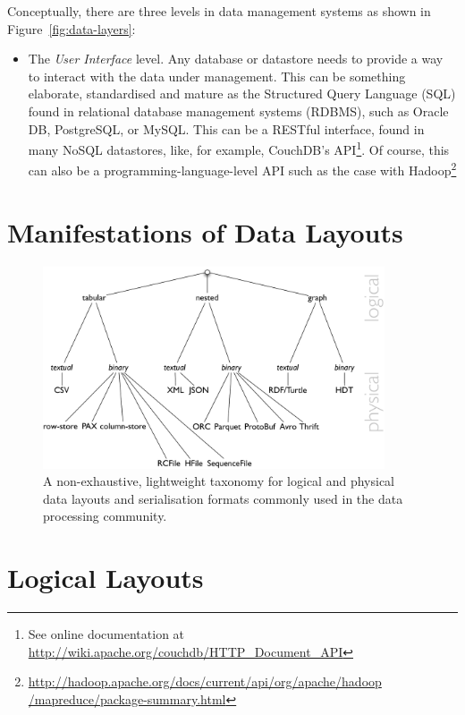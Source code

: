 \documentclass{llncs}
\begin{document}
Conceptually, there are three levels in data management systems as shown in
Figure~\ref{fig:data-layers}:
\begin{itemize}
	\item The \emph{User Interface} level. Any database or datastore needs 
to provide a way to interact with the data under management. This can be 
something elaborate, standardised and mature as the Structured Query Language 
(SQL) found in relational database management systems (RDBMS), such as 
Oracle DB, PostgreSQL, or MySQL. This can be a RESTful interface, found in many 
NoSQL datastores, like, for example, CouchDB's API\footnote{See online 
documentation at \url{http://wiki.apache.org/couchdb/HTTP_Document_API}}. Of
course, this can also be a programming-language-level API such as the case with
Hadoop\footnote{\url{http://hadoop.apache.org/docs/current/api/org/apache/hadoop
/mapreduce/package-summary.html}}
\end{itemize}

\section{Manifestations of Data Layouts}
\label{sec:mani}




\begin{figure}[h!]
\centering
\includegraphics[width=0.9\textwidth]{taxonomy-dl}
\caption{A non-exhaustive, lightweight taxonomy for logical and physical data 
layouts and serialisation formats commonly used in the data processing 
community.}
\label{fig:taxonomy-dl}
\end{figure}

\section{Logical Layouts}
\label{sec:loglay}
\end{document}

